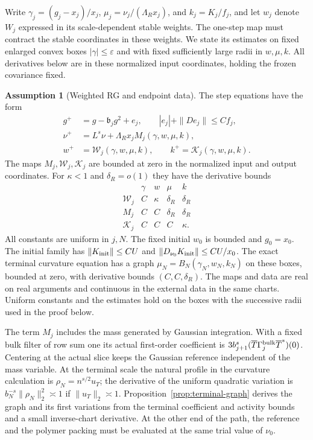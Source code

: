 \documentclass[11pt]{article}
\theoremstyle{definition}
\newtheorem{assumption}[theorem]{Assumption}
\begin{document}
Write \(\gamma_j=(g_j-x_j)/x_j\),
\(\mu_j=\nu_j/(\Lambda_R x_j)\), and \(k_j=K_j/f_j\), and let
\(w_j\) denote \(W_j\) expressed in its scale-dependent stable weights.
The one-step map must contract the stable coordinates in these weights.
We state its estimates on fixed enlarged convex boxes
\(|\gamma|\le\varepsilon\) and with fixed sufficiently large radii
in \(w,\mu,k\). All derivatives below are in these normalized
input coordinates, holding the frozen covariance fixed.

\begin{assumption}[Weighted RG and endpoint data]\label{ass:path}
The step equations have the form
\begin{align}
 g^+ &= g-\mathfrak b_jg^2+e_j,\qquad
   |e_j|+\|D e_j\|\le C f_j,\\
 \nu^+ &= L^s\nu+\Lambda_R x_j M_j(\gamma,w,\mu,k),\\
 w^+ &= \mathcal W_j(\gamma,w,\mu,k),\qquad
 k^+ = \mathcal K_j(\gamma,w,\mu,k).
\end{align}
The maps \(M_j,\mathcal W_j,\mathcal K_j\) are bounded at zero in
the normalized input and output coordinates. For \(\kappa<1\) and \(\delta_R=o(1)\)
they have the derivative bounds
\begin{equation}
\begin{array}{c|cccc}
 &\gamma&w&\mu&k\\ \hline
 \mathcal W_j&C&\kappa&\delta_R&\delta_R\\
 M_j&C&C&\delta_R&\delta_R\\
 \mathcal K_j&C&C&C&\kappa .
\end{array}
\end{equation}
All constants are uniform in \(j,N\). The fixed initial \(w_0\) is
bounded and \(g_0=x_0\). The initial family has
\(\|K_{\rm init}\|\le CU\) and
\(\|D_{\nu_0} K_{\rm init}\|\le CU/x_0\).
The exact terminal curvature equation has a graph
\(\mu_N=B_N(\gamma_N,w_N,k_N)\) on these boxes,
bounded at zero, with derivative bounds \((C,C,\delta_R)\).
The maps and data are real on real arguments and continuous in the
external data in the same charts. Uniform constants and the estimates
hold on the boxes with the successive radii used in the proof below.
\end{assumption}

The term \(M_j\) includes the mass generated by Gaussian integration. With a
fixed bulk filter of row sum one its actual first-order coefficient is
\(3 b_{j+1}^s(\overline T\Gamma_j^{\rm bulk}\overline T^*)(0)\).
Centering at the actual slice keeps the Gaussian reference
independent of the mass variable. At the terminal scale the natural
profile in the curvature calculation is \(\rho_N=n^{s/2}u_T\);
the derivative of the uniform quadratic variation is
\(b_N^{-s}\|\rho_N\|_2^2\asymp 1\) if
\(\|u_T\|_2\asymp1\). Proposition~\ref{prop:terminal-graph} derives the graph and
its first variations from the terminal coefficient and activity
bounds and a small inverse-chart derivative. At the other end of the path, the reference and the polymer packing
must be evaluated at the same trial value of \(\nu_0\).
\end{document}
